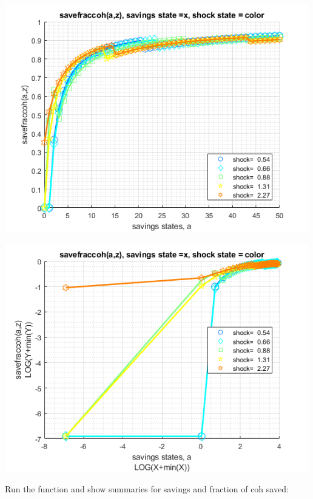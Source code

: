 \documentclass[
]{book}
\begin{document}
\includegraphics[width=5.20833in,height=\textheight]{img/fx_vfi_az_vec_images/figure_0.png}

\includegraphics[width=5.20833in,height=\textheight]{img/fx_vfi_az_vec_images/figure_1.png}

Run the function and show summaries for savings and fraction of coh
saved:
\end{document}
